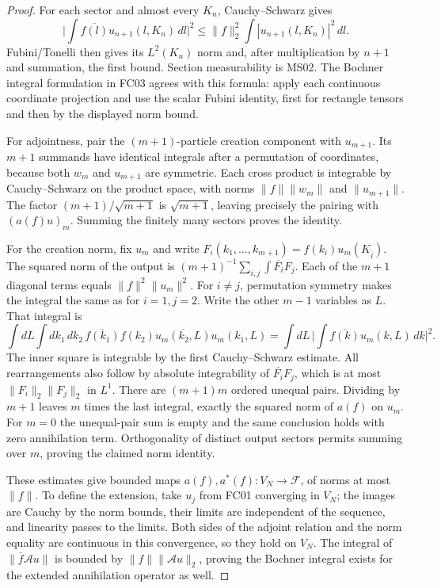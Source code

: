 \documentclass[11pt,a4paper]{article}
\theoremstyle{remark}\newtheorem{remark}[theorem]{Remark}
\newcommand{\F}{\mathcal F}\newcommand{\Q}{\mathcal Q}\newcommand{\HH}{\mathcal H}
\begin{document}
\begin{proof}
For each sector and almost every $K_n$, Cauchy--Schwarz gives
\[
 \Big|\int\overline{f(l)}u_{n+1}(l,K_n)\,dl\Big|^2
 \leq\|f\|_2^2\int|u_{n+1}(l,K_n)|^2\,dl.
\]
Fubini/Tonelli then gives its $L^2(K_n)$ norm and, after multiplication by $n+1$ and summation, the first bound. Section measurability is MS02. The Bochner integral formulation in FC03 agrees with this formula: apply each continuous coordinate projection and use the scalar Fubini identity, first for rectangle tensors and then by the displayed norm bound.

For adjointness, pair the $(m+1)$-particle creation component with $u_{m+1}$. Its $m+1$ summands have identical integrals after a permutation of coordinates, because both $w_m$ and $u_{m+1}$ are symmetric. Each cross product is integrable by Cauchy--Schwarz on the product space, with norms $\|f\|\|w_m\|$ and $\|u_{m+1}\|$. The factor $(m+1)/\sqrt{m+1}$ is $\sqrt{m+1}$, leaving precisely the pairing with $(a(f)u)_m$. Summing the finitely many sectors proves the identity.

For the creation norm, fix $u_m$ and write
$F_i(k_1,\ldots,k_{m+1})=f(k_i)u_m(K_{\widehat i})$.
The squared norm of the output is
$(m+1)^{-1}\sum_{i,j}\int\overline{F_i}F_j$.
Each of the $m+1$ diagonal terms equals $\|f\|^2\|u_m\|^2$. For $i\ne j$, permutation symmetry makes the integral the same as for $i=1,j=2$. Write the other $m-1$ variables as $L$. That integral is
\[
 \int dL\int dk_1\,dk_2\,
 \overline{f(k_1)}f(k_2)
 \overline{u_m(k_2,L)}u_m(k_1,L)
 =\int dL\,\Big|\int\overline{f(k)}u_m(k,L)\,dk\Big|^2.
\]
The inner square is integrable by the first Cauchy--Schwarz estimate. All rearrangements also follow by absolute integrability of $\overline{F_i}F_j$, which is at most $\|F_i\|_2\|F_j\|_2$ in $L^1$. There are $(m+1)m$ ordered unequal pairs. Dividing by $m+1$ leaves $m$ times the last integral, exactly the squared norm of $a(f)$ on $u_m$. For $m=0$ the unequal-pair sum is empty and the same conclusion holds with zero annihilation term. Orthogonality of distinct output sectors permits summing over $m$, proving the claimed norm identity.

These estimates give bounded maps $a(f),a^*(f):V_N\to\F$, of norms at most $\|f\|$. To define the extension, take $u_j$ from FC01 converging in $V_N$; the images are Cauchy by the norm bounds, their limits are independent of the sequence, and linearity passes to the limits. Both sides of the adjoint relation and the norm equality are continuous in this convergence, so they hold on $V_N$. The integral of $\|\overline f\mathcal Au\|$ is bounded by $\|f\|\|\mathcal Au\|_2$, proving the Bochner integral exists for the extended annihilation operator as well.
\end{proof}
\end{document}
